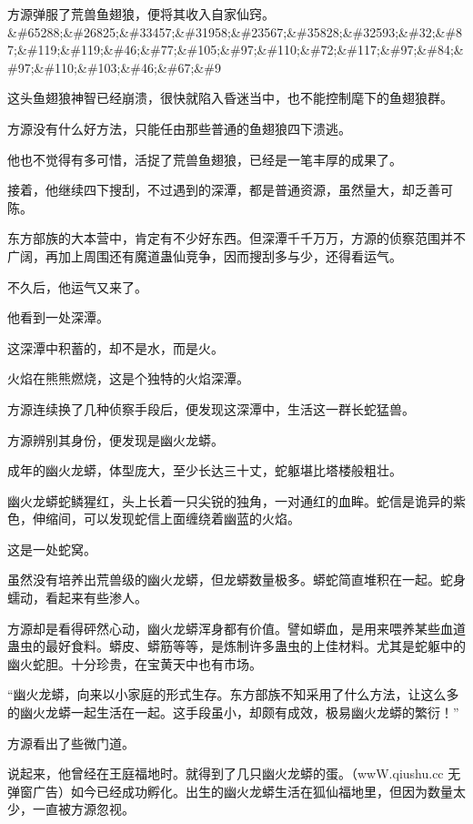 
\begin{this_body}

方源弹服了荒兽鱼翅狼，便将其收入自家仙窍。\&\#65288;\&\#26825;\&\#33457;\&\#31958;\&\#23567;\&\#35828;\&\#32593;\&\#32;\&\#87;\&\#119;\&\#119;\&\#46;\&\#77;\&\#105;\&\#97;\&\#110;\&\#72;\&\#117;\&\#97;\&\#84;\&\#97;\&\#110;\&\#103;\&\#46;\&\#67;\&\#9

这头鱼翅狼神智已经崩溃，很快就陷入昏迷当中，也不能控制麾下的鱼翅狼群。

方源没有什么好方法，只能任由那些普通的鱼翅狼四下溃逃。

他也不觉得有多可惜，活捉了荒兽鱼翅狼，已经是一笔丰厚的成果了。

接着，他继续四下搜刮，不过遇到的深潭，都是普通资源，虽然量大，却乏善可陈。

东方部族的大本营中，肯定有不少好东西。但深潭千千万万，方源的侦察范围并不广阔，再加上周围还有魔道蛊仙竞争，因而搜刮多与少，还得看运气。

不久后，他运气又来了。

他看到一处深潭。

这深潭中积蓄的，却不是水，而是火。

火焰在熊熊燃烧，这是个独特的火焰深潭。

方源连续换了几种侦察手段后，便发现这深潭中，生活这一群长蛇猛兽。

方源辨别其身份，便发现是幽火龙蟒。

成年的幽火龙蟒，体型庞大，至少长达三十丈，蛇躯堪比塔楼般粗壮。

幽火龙蟒蛇鳞猩红，头上长着一只尖锐的独角，一对通红的血眸。蛇信是诡异的紫色，伸缩间，可以发现蛇信上面缠绕着幽蓝的火焰。

这是一处蛇窝。

虽然没有培养出荒兽级的幽火龙蟒，但龙蟒数量极多。蟒蛇简直堆积在一起。蛇身蠕动，看起来有些渗人。

方源却是看得砰然心动，幽火龙蟒浑身都有价值。譬如蟒血，是用来喂养某些血道蛊虫的最好食料。蟒皮、蟒筋等等，是炼制许多蛊虫的上佳材料。尤其是蛇躯中的幽火蛇胆。十分珍贵，在宝黄天中也有市场。

“幽火龙蟒，向来以小家庭的形式生存。东方部族不知采用了什么方法，让这么多的幽火龙蟒一起生活在一起。这手段虽小，却颇有成效，极易幽火龙蟒的繁衍！”

方源看出了些微门道。

说起来，他曾经在王庭福地时。就得到了几只幽火龙蟒的蛋。（wwW.qiushu.cc 无弹窗广告）如今已经成功孵化。出生的幽火龙蟒生活在狐仙福地里，但因为数量太少，一直被方源忽视。


\end{this_body}

